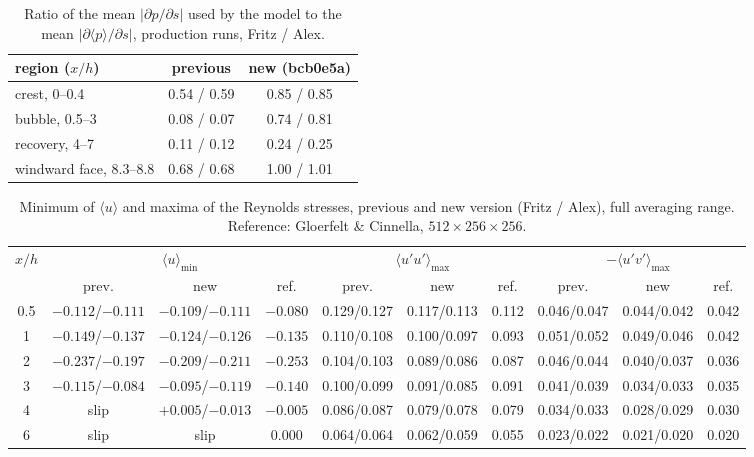 \documentclass[11pt,a4paper]{article}
\newcommand{\dpds}{\partial p/\partial s}
\begin{document}
\begin{table}[htbp]
\centering
\small
\caption{Ratio of the mean $|\dpds|$ used by the model to the mean
$|\partial\langle p\rangle/\partial s|$, production runs, Fritz / Alex.}
\label{tab:dupv2dpds}
\begin{tabular}{@{}lcc@{}}
\toprule
region ($x/h$) & previous & new (bcb0e5a) \\
\midrule
crest, 0--0.4 & 0.54 / 0.59 & 0.85 / 0.85 \\
bubble, 0.5--3 & 0.08 / 0.07 & 0.74 / 0.81 \\
recovery, 4--7 & 0.11 / 0.12 & 0.24 / 0.25 \\
windward face, 8.3--8.8 & 0.68 / 0.68 & 1.00 / 1.01 \\
\bottomrule
\end{tabular}
\end{table}

\begin{table}[htbp]
\centering
\footnotesize
\setlength{\tabcolsep}{3pt}
\caption{Minimum of $\langle u\rangle$ and maxima of the Reynolds stresses,
previous and new version (Fritz / Alex), full averaging range. Reference:
Gloerfelt \& Cinnella, $512\times256\times256$.}
\label{tab:dupv2prof}
\begin{tabular}{@{}cccccccccc@{}}
\toprule
$x/h$ & \multicolumn{3}{c}{$\langle u\rangle_{\min}$} &
\multicolumn{3}{c}{$\langle u'u'\rangle_{\max}$} &
\multicolumn{3}{c}{$-\langle u'v'\rangle_{\max}$} \\
 & prev. & new & ref. & prev. & new & ref. & prev. & new & ref. \\
\midrule
0.5 & $-0.112$/$-0.111$ & $-0.109$/$-0.111$ & $-0.080$ & 0.129/0.127 & 0.117/0.113 & 0.112 & 0.046/0.047 & 0.044/0.042 & 0.042 \\
1 & $-0.149$/$-0.137$ & $-0.124$/$-0.126$ & $-0.135$ & 0.110/0.108 & 0.100/0.097 & 0.093 & 0.051/0.052 & 0.049/0.046 & 0.042 \\
2 & $-0.237$/$-0.197$ & $-0.209$/$-0.211$ & $-0.253$ & 0.104/0.103 & 0.089/0.086 & 0.087 & 0.046/0.044 & 0.040/0.037 & 0.036 \\
3 & $-0.115$/$-0.084$ & $-0.095$/$-0.119$ & $-0.140$ & 0.100/0.099 & 0.091/0.085 & 0.091 & 0.041/0.039 & 0.034/0.033 & 0.035 \\
4 & slip & $+0.005$/$-0.013$ & $-0.005$ & 0.086/0.087 & 0.079/0.078 & 0.079 & 0.034/0.033 & 0.028/0.029 & 0.030 \\
6 & slip & slip & 0.000 & 0.064/0.064 & 0.062/0.059 & 0.055 & 0.023/0.022 & 0.021/0.020 & 0.020 \\
\bottomrule
\end{tabular}
\end{table}
\end{document}
